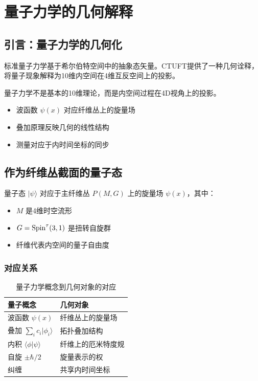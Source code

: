 \section{量子力学的几何解释}
\label{sec:quantum}

\subsection{引言：量子力学的几何化}

标准量子力学基于希尔伯特空间中的抽象态矢量。CTUFT提供了一种几何诠释，将量子现象解释为10维内空间在4维互反空间上的投影。

\begin{insight}[量子力学作为投影]
量子力学不是基本的10维理论，而是内空间过程在4D视角上的投影。
\begin{itemize}
    \item 波函数 $\psi(x)$ 对应纤维丛上的旋量场
    \item 叠加原理反映几何的线性结构
    \item 测量对应于内时间坐标的同步
\end{itemize}
\end{insight}

\subsection{作为纤维丛截面的量子态}

\begin{definition}[几何量子态]
量子态 $|\psi\rangle$ 对应于主纤维丛 $P(M, G)$ 上的旋量场 $\psi(x)$，其中：
\begin{itemize}
    \item $M$ 是4维时空流形
    \item $G = \mathrm{Spin}^\tau(3,1)$ 是扭转自旋群
    \item 纤维代表内空间的量子自由度
\end{itemize}
\end{definition}

\subsubsection{对应关系}

\begin{table}[htbp]
\centering
\caption{量子力学概念到几何对象的对应}
\begin{tabular}{ll}
\hline
\textbf{量子概念} & \textbf{几何对象} \\
\hline
波函数 $\psi(x)$ & 纤维丛上的旋量场 \\
叠加 $\sum_i c_i |\phi_i\rangle$ & 拓扑叠加结构 \\
内积 $\langle\phi|\psi\rangle$ & 纤维上的厄米特度规 \\
自旋 $\pm\hbar/2$ & 旋量表示的权 \\
纠缠 & 共享内时间坐标 \\
\hline
\end{tabular}
\end{table}

